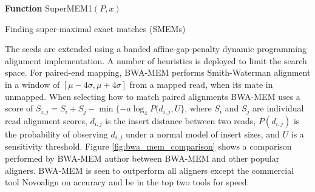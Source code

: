 \begin{algorithm2e}[h]
\DontPrintSemicolon
\footnotesize
{}
\BlankLine
\textbf{Function} {\sc SuperMEM1}$(P,x)$
\caption{Finding super-maximal exact matches (SMEMs)\autocite{li2012exploring}}
\label{alg:find_smems}
\end{algorithm2e}

The seeds are extended using a banded affine-gap-penalty dynamic programming alignment implementation. A number of heuristics is deployed to limit the search space. For paired-end mapping, BWA-MEM performs Smith-Waterman alignment in a window of $[\mu - 4\sigma, \mu+4\sigma]$ from a mapped read, when its mate in unmapped. When selecting how to match paired alignments BWA-MEM uses a score of $S_{i,j}=S_i+S_j-\min{\{-a\log_4P(d_{i,j},U\}}$, where $S_i$ and $S_j$ are individual read alignment scores, $d_{i,j}$ is the insert distance between two reads, $P(d_{i,j})$ is the probability of observing $d_{i,j}$ under a normal model of insert sizes, and $U$ is a sensitivity threshold. Figure \ref{fig:bwa_mem_comparison} shows a comparison performed by BWA-MEM author between BWA-MEM and other popular aligners. BWA-MEM is seen to outperform all aligners except the commercial tool Novoalign on accuracy and be in the top two tools for speed.

